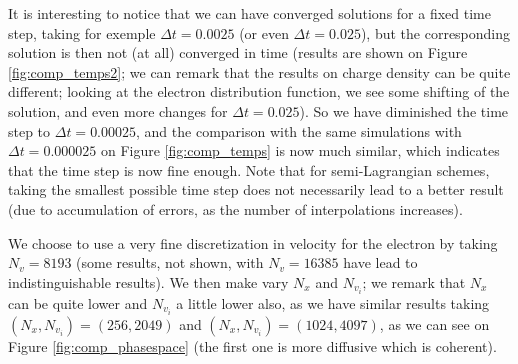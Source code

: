 \documentclass{article}
\numberwithin{equation}{section}
\begin{document}
It is interesting to notice that we can have converged solutions for a fixed time step, taking for exemple $\Delta t = 0.0025$ (or even $\Delta t =0.025$), but the corresponding solution is then not (at all) converged in time
(results are shown on Figure \ref{fig:comp_temps2}; we can remark that the results on charge density can be quite different; looking at the electron distribution function, we see some shifting
of the solution, and even more changes for $\Delta t =0.025$). So we have diminished the time step to $\Delta t = 0.00025$, and the comparison with the same simulations with  $\Delta t = 0.000025$ on Figure \ref{fig:comp_temps} 
is now much similar, which indicates that the 
time step is now fine enough. Note that for semi-Lagrangian schemes, taking the smallest possible time step does not necessarily lead to a better result (due to accumulation of errors, as the number of interpolations 
increases).

We choose to use a very fine discretization in velocity for the electron by taking $N_v=8193$ (some results, not shown, with $N_v=16385$ have lead to indistinguishable results).
We then make vary $N_x$ and $N_{v_i}$; we remark that $N_x$ can be quite lower and $N_{v_i}$ a little lower also, as we have similar results taking $(N_x,N_{v_i})=(256,2049)$ and 
$(N_x,N_{v_i})=(1024,4097)$, as we can see on Figure \ref{fig:comp_phasespace} (the first one is more diffusive which is coherent). 
\end{document}
